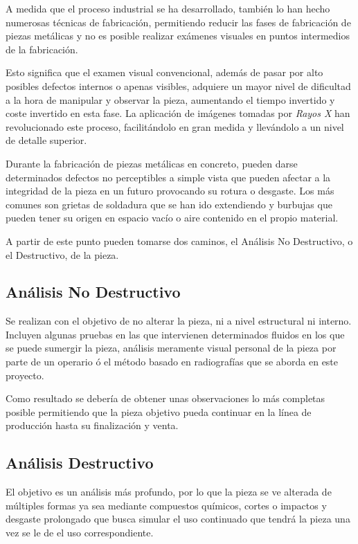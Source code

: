 
A medida que el proceso industrial se ha desarrollado, también lo han hecho numerosas técnicas de fabricación, permitiendo reducir las fases de fabricación de piezas metálicas y no es posible realizar exámenes visuales en puntos intermedios de la fabricación.

Esto significa que el examen visual convencional, además de pasar por alto posibles defectos internos o apenas visibles, adquiere un mayor nivel de dificultad a la hora de manipular y observar la pieza, aumentando el tiempo invertido y coste invertido en esta fase. La aplicación de imágenes tomadas por \emph{Rayos X} han revolucionado este proceso, facilitándolo en gran medida y llevándolo a un nivel de detalle superior. 

Durante la fabricación de piezas metálicas en concreto, pueden darse determinados defectos no perceptibles a simple vista que pueden afectar a la integridad de la pieza en un futuro provocando su rotura o desgaste. Los más comunes son grietas de soldadura que se han ido extendiendo y burbujas que pueden tener su origen en espacio vacío o aire contenido en el propio material.

A partir de este punto pueden tomarse dos caminos, el Análisis No Destructivo, o el Destructivo, de la pieza.

\subsection{Análisis No Destructivo}
Se realizan con el objetivo de no alterar la pieza, ni a nivel estructural ni interno. Incluyen algunas pruebas en las que intervienen determinados fluidos en los que se puede sumergir la pieza, análisis meramente visual personal de la pieza por parte de un operario ó el método basado en radiografías que se aborda en este proyecto.

Como resultado se debería de obtener unas observaciones lo más completas posible permitiendo que la pieza objetivo pueda continuar en la línea de producción hasta su finalización y venta.

\subsection{Análisis Destructivo}
El objetivo es un análisis más profundo, por lo que la pieza se ve alterada de múltiples formas ya sea mediante compuestos químicos, cortes o impactos y desgaste prolongado que busca simular el uso continuado que tendrá la pieza una vez se le de el uso correspondiente.

